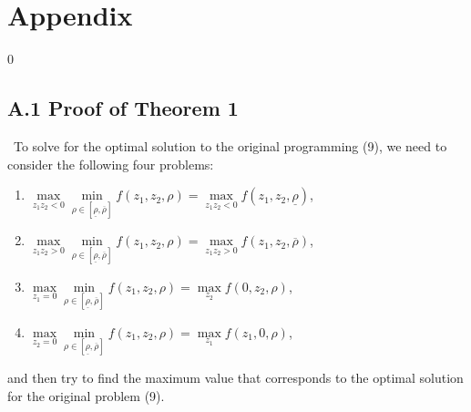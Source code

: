 \documentclass[10pt]{article}
\begin{document}

\section*{Appendix}
\renewcommand{\theequation}{A.\arabic{equation}}
\setcounter{equation}0

\subsection*{A.1 \quad Proof of Theorem 1}

\quad \
To solve for the optimal solution to the original programming (9), we need to consider the following four problems:
\begin{enumerate}
\item $ \max\limits_{z_1 z_2 < 0} \min\limits_{\rho \in [\underline{\rho}, \overline{\rho}]} f (z_1, z_2, \rho) = \max\limits_{z_1 z_2 < 0} f (z_1, z_2, \underline{\rho}) $,
\item $ \max\limits_{z_1 z_2 > 0} \min\limits_{\rho \in [\underline{\rho}, \overline{\rho}]} f (z_1, z_2, \rho) = \max\limits_{z_1 z_2 > 0} f (z_1, z_2, \overline{\rho}) $,
\item $ \max\limits_{z_1 = 0} \min\limits_{\rho \in [\underline{\rho}, \overline{\rho}]} f (z_1, z_2, \rho) = \max\limits_{z_2} f (0, z_2, \rho) $,
\item $ \max\limits_{z_2 = 0} \min\limits_{\rho \in [\underline{\rho}, \overline{\rho}]} f (z_1, z_2, \rho) = \max\limits_{z_1} f (z_1, 0, \rho) $,
\end{enumerate}
and then try to find the maximum value that corresponds to the optimal solution for the original problem (9).
\end{document}
